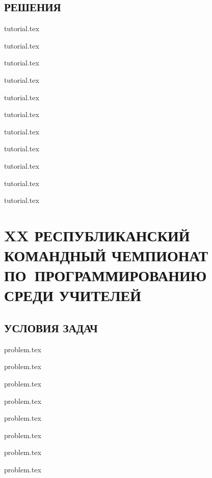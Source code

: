\documentclass[a5paper, twoside, 11pt, openany]{book}
\begin{document}

\newpage
\section[Решения]{РЕШЕНИЯ}
\thispagestyle{plain}

\renewcommand{\importproblem}[1]{
\graphicspath{{problems/students/#1/statements/russian/}}
{tutorial.tex}	
}

\importproblem{prizes}
\importproblem{idiocracy}
\importproblem{robot-gardener}
\importproblem{simple-game}
\importproblem{rectangle-coloring}
\importproblem{foodshop-2}
\importproblem{interview-at-fun-club}
\importproblem{relay-race-with-weight}
\importproblem{suburban-grasshoppers}
\importproblem{pills}
\importproblem{debt-evasion}

\begin{landscape}

\end{landscape}


\newpage
{}
\chapter*{XX РЕСПУБЛИКАНСКИЙ КОМАНДНЫЙ ЧЕМПИОНАТ ПО~ПРОГРАММИРОВАНИЮ СРЕДИ УЧИТЕЛЕЙ}
\thispagestyle{empty}


\newpage
\section[Условия задач]{УСЛОВИЯ ЗАДАЧ}
\thispagestyle{plain}

\renewcommand{\importproblem}[1]{
\graphicspath{{problems/teachers/#1/statements/russian/}}
{problem.tex}	
}

\importproblem{pills}
\importproblem{naruto-jumping}
\importproblem{robot-gardener}
\importproblem{fishermen}
\importproblem{set}
\importproblem{interview-at-fun-club}
\importproblem{wolves}
\importproblem{straight-way}

\end{document}
